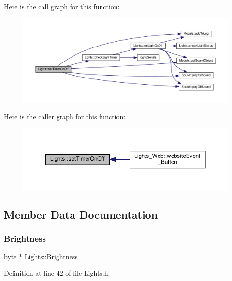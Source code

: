 Here is the call graph for this function\+:
\nopagebreak
\begin{figure}[H]
\begin{center}
\leavevmode
\includegraphics[width=350pt]{class_lights_a3c5051babf4dacdeecced14217f6f886_cgraph}
\end{center}
\end{figure}
Here is the caller graph for this function\+:
\nopagebreak
\begin{figure}[H]
\begin{center}
\leavevmode
\includegraphics[width=350pt]{class_lights_a3c5051babf4dacdeecced14217f6f886_icgraph}
\end{center}
\end{figure}


\subsection{Member Data Documentation}
\mbox{\label{class_lights_ac5fa7d7fdfb9a051a63dde55b67925fe}} 
\subsubsection{\texorpdfstring{Brightness}{Brightness}}
{\footnotesize\ttfamily byte $\ast$ Lights\+::\+Brightness\hspace{0.3cm}{\ttfamily [protected]}}



Definition at line 42 of file Lights.\+h.

